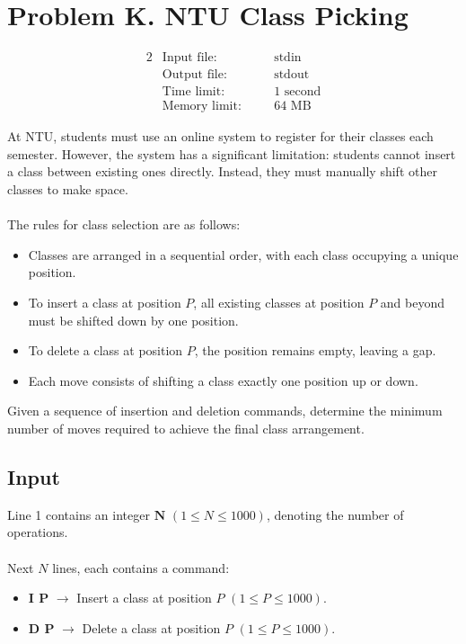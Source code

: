 \documentclass[12pt,a4paper]{article}
\begin{document}
\newpage

\section*{\fontsize{18}{12}Problem K. NTU Class Picking}

\begin{alignat*} {2}
 &   \text{Input file:}   \quad     &&\text{stdin}\\
 &   \text{Output file:}  \quad     &&\text{stdout}\\
 &   \text{Time limit:}   \quad     &&\text{1 second}\\
 &   \text{Memory limit:} \quad     &&\text{64 MB}
\end{alignat*}

\noindent
At NTU, students must use an online system to register for their classes each semester. However, the system has a significant limitation: students cannot insert a class between existing ones directly. Instead, they must manually shift other classes to make space.
\\\\
\noindent
The rules for class selection are as follows:
\begin{itemize}
    \item Classes are arranged in a sequential order, with each class occupying a unique position.
    \item To insert a class at position \textbf{\( P \)}, all existing classes at position \textbf{\( P \)} and beyond must be shifted down by one position.
    \item To delete a class at position \textbf{\( P \)}, the position remains empty, leaving a gap.
    \item Each move consists of shifting a class exactly one position up or down.
\end{itemize}

\noindent
Given a sequence of insertion and deletion commands, determine the minimum number of moves required to achieve the final class arrangement.

\subsection*{\fontsize{16}{12}Input}
Line 1 contains an integer \(\textbf{N}\) \((1 \leq N \leq 1000)\), denoting the number of operations.
\\\\
\noindent
Next \textbf{\( N \)} lines, each contains a command:
    \begin{itemize}
        \item \textbf{I P} $\rightarrow$ Insert a class at position \( P \) \((1 \leq P \leq 1000)\).
        \item \textbf{D P} $\rightarrow$ Delete a class at position \( P \) \((1 \leq P \leq 1000)\).
    \end{itemize}
\end{document}
